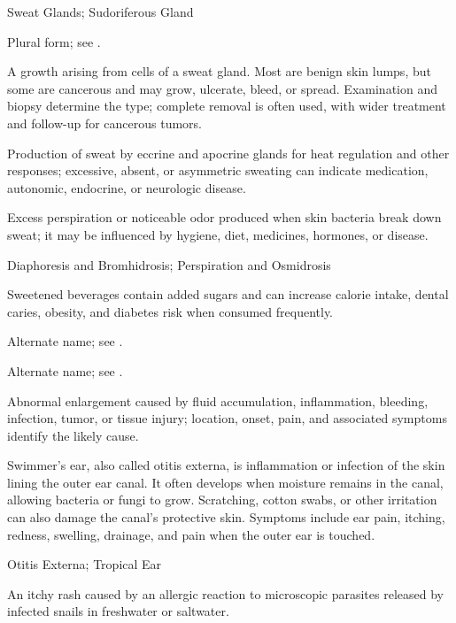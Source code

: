 \synonyms
Sweat Glands; Sudoriferous Gland

 Plural form; see .

 A growth arising from cells of a sweat gland. Most are benign skin lumps, but some are cancerous and may grow, ulcerate, bleed, or spread. Examination and biopsy determine the type; complete removal is often used, with wider treatment and follow-up for cancerous tumors.

 Production of sweat by eccrine and apocrine glands for heat regulation and other responses; excessive, absent, or asymmetric sweating can indicate medication, autonomic, endocrine, or neurologic disease.

 Excess perspiration or noticeable odor produced when skin bacteria break down sweat; it may be influenced by hygiene, diet, medicines, hormones, or disease.

\synonyms
Diaphoresis and Bromhidrosis; Perspiration and Osmidrosis

 Sweetened beverages contain added sugars and can increase calorie intake, dental caries, obesity, and diabetes risk when consumed frequently.

 Alternate name; see .

 Alternate name; see .

 Abnormal enlargement caused by fluid accumulation, inflammation, bleeding, infection, tumor, or tissue injury; location, onset, pain, and associated symptoms identify the likely cause.

 Swimmer’s ear, also called otitis externa, is inflammation or infection of the skin lining the outer ear canal. It often develops when moisture remains in the canal, allowing bacteria or fungi to grow. Scratching, cotton swabs, or other irritation can also damage the canal’s protective skin. Symptoms include ear pain, itching, redness, swelling, drainage, and pain when the outer ear is touched.

\synonyms
Otitis Externa; Tropical Ear

 An itchy rash caused by an allergic reaction to microscopic parasites released by infected snails in freshwater or saltwater.


